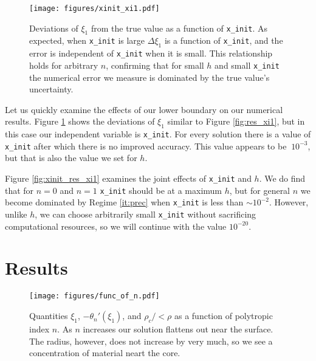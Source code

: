 \documentclass[twocolumn]{aastex631}
\begin{document}
\begin{figure}
    \begin{centering}
        \texttt{[image: figures/xinit\_xi1.pdf]}
        \caption{Deviations of $\xi_1$ from the true value as a
        function of \texttt{x\_init}. As expected, when \texttt{x\_init}
        is large $\Delta \xi_1$ is a function of \texttt{x\_init},
        and the error is independent of \texttt{x\_init} when it is small.
        This relationship holds for arbitrary $n$, confirming that
        for small $h$ and small \texttt{x\_init} the numerical
        error we measure is dominated by the true value's uncertainty.}
        \label{fig:xinit_xi1}
    \end{centering}
\end{figure}

Let us quickly examine the effects of our lower boundary on our
numerical results. Figure \ref{fig:xinit_xi1} shows the
deviations of $\xi_1$ similar to Figure \ref{fig:res_xi1},
but in this case our independent variable is \texttt{x\_init}.
For every solution there is a value of \texttt{x\_init}
after which there is no improved accuracy. This value appears to be
$~10^{-3}$, but that is also the value we set for $h$.

Figure \ref{fig:xinit_res_xi1} examines the joint effects of 
\texttt{x\_init} and $h$. We do find that for $n=0$ and $n=1$
\texttt{x\_init} should be at a maximum $h$, but for general $n$
we become dominated by Regime \ref{it:prec} when \texttt{x\_init}
is less than $\sim 10^{-2}$. However, unlike $h$, we can choose arbitrarily
small \texttt{x\_init} without sacrificing computational
resources, so we will continue with the value $10^{-20}$.



\section{Results}
\label{sec:results}


\begin{figure}
    \begin{centering}
        \texttt{[image: figures/func\_of\_n.pdf]}
        \caption{Quantities $\xi_1$, $-\theta_n'(\xi_1)$,
        and $\rho_c/<\rho$ as a function of polytropic index $n$.
        As $n$ increases our solution flattens out near the surface.
        The radius, however, does not increase by very much, so
        we see a concentration of material neart the core.}
        \label{fig:func_of_n}
    \end{centering}
\end{figure}
\end{document}
